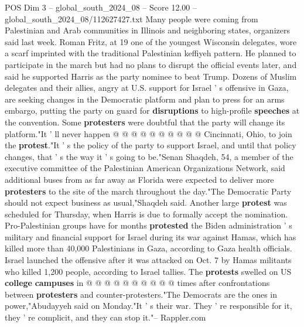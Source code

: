 \begin{textsample}{POS Dim 3 – global\_south\_2024\_08 – Score 12.00 – global\_south\_2024\_08/112627427.txt}
Many people were coming from Palestinian and Arab communities in Illinois and neighboring states, organizers said last week.
Roman Fritz, at 19 one of the youngest Wisconsin delegates, wore a scarf imprinted with the traditional Palestinian keffiyeh pattern.
He planned to participate in the march but had no plans to disrupt the official events later, and said he supported Harris as the party nominee to beat Trump.
Dozens of Muslim delegates and their allies, angry at U.S. support for Israel ' s offensive in Gaza, are seeking changes in the Democratic platform and plan to press for an arms embargo, putting the party on guard for \textbf{disruptions} to high-profile \textbf{speeches} at the convention.
Some \textbf{protesters} were doubtful that the party will change its platform."It ' ll never happen @ @ @ @ @ @ @ @ @ @ Cincinnati, Ohio, to join the \textbf{protest}."It ' s the policy of the party to support Israel, and until that policy changes, that ' s the way it ' s going to be."Senan Shaqdeh, 54, a member of the executive committee of the Palestinian American Organizations Network, said additional buses from as far away as Florida were expected to deliver more \textbf{protesters} to the site of the march throughout the day."The Democratic Party should not expect business as usual,"Shaqdeh said.
Another large \textbf{protest} was scheduled for Thursday, when Harris is due to formally accept the nomination.
Pro-Palestinian groups have for months \textbf{protested} the Biden administration ' s military and financial support for Israel during its war against Hamas, which has killed more than 40,000 Palestinians in Gaza, according to Gaza health officials.
Israel launched the offensive after it was attacked on Oct. 7 by Hamas militants who killed 1,200 people, according to Israel tallies.
The \textbf{protests} swelled on US \textbf{college} \textbf{campuses} in @ @ @ @ @ @ @ @ @ @ times after confrontations between \textbf{protesters} and counter-protesters."The Democrats are the ones in power,"Abudayyeh said on Monday."It ' s their war.
They ' re responsible for it, they ' re complicit, and they can stop it."-- Rappler.com

\end{textsample}
